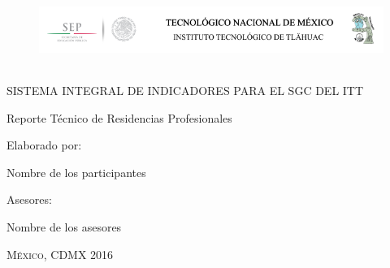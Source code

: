 \documentclass[11pt]{book}
\begin{document}
\begin{titlepage}
\begin{center}


\begin{figure}[h]
\begin{center}
\includegraphics[width=13cm, height=2.5cm]{encabezado.png}
\end{center}
\end{figure}

\vspace{2em}

SISTEMA INTEGRAL DE INDICADORES PARA EL SGC DEL ITT

\vspace{5em}

Reporte Técnico de Residencias Profesionales

\vspace{6em}

Elaborado por:

\vspace{0.5em}

Nombre de los participantes

\vspace{2em}

Asesores:

\vspace{0.5em}

Nombre de los asesores

\vspace{0.5em}





\end{center}

\vspace*{\fill}
\textsc{México, CDMX \hspace*{\fill} 2016}

\end{titlepage}


\frontmatter

\end{document}
